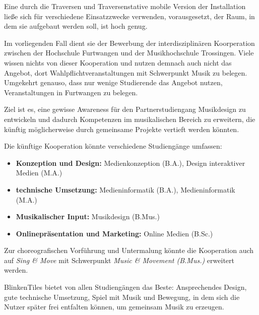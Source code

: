 \clearpage


Eine durch die Traversen und Traversenstative mobile Version der Installation ließe sich für verschiedene Einsatzzwecke verwenden, vorausgesetzt, der Raum, in dem sie aufgebaut werden soll, ist hoch genug.

Im vorliegenden Fall dient sie der Bewerbung der interdisziplinären Koorperation zwischen der Hochschule Furtwangen und der Musikhochschule Trossingen. Viele wissen nichts von dieser Kooperation und nutzen demnach auch nicht das Angebot, dort Wahlpflichtveranstaltungen mit Schwerpunkt Musik zu belegen. Umgekehrt genauso, dass nur wenige Studierende das Angebot nutzen, Veranstaltungen in Furtwangen zu belegen.

Ziel ist es, eine gewisse Awareness für den Partnerstudiengang Musikdesign zu entwickeln und dadurch Kompetenzen im musikalischen Bereich zu erweitern, die künftig möglicherweise durch gemeinsame Projekte vertieft werden könnten.

Die künftige Kooperation könnte verschiedene Studiengänge umfassen:

\vspace{0.5em}

\begin{itemize}
	\item \textbf{Konzeption und Design:} Medienkonzeption (B.A.), Design interaktiver Medien (M.A.)
	\item \textbf{technische Umsetzung:} Medieninformatik (B.A.), Medieninformatik (M.A.)
	\item \textbf{Musikalischer Input:} Musikdesign (B.Mus.)
	\item \textbf{Onlinepräsentation und Marketing:} Online Medien (B.Sc.)
\end{itemize}

\vspace{0.5em}

Zur choreografischen Vorführung und Untermalung könnte die Kooperation auch auf \emph{Sing \& Move} mit Schwerpunkt \emph{Music \& Movement (B.Mus.)} erweitert werden.

BlinkenTiles bietet von allen Studiengängen das Beste: Ansprechendes Design, gute technische Umsetzung, Spiel mit Musik und Bewegung, in dem sich die Nutzer später frei entfalten können, um gemeinsam Musik zu erzeugen.

\clearpage






